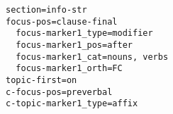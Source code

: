 \documentclass[a4paper]{article}
\begin{document}
{\small\begin{verbatim}
section=info-str
focus-pos=clause-final
  focus-marker1_type=modifier
  focus-marker1_pos=after
  focus-marker1_cat=nouns, verbs
  focus-marker1_orth=FC
topic-first=on
c-focus-pos=preverbal
c-topic-marker1_type=affix
\end{verbatim}}
\end{document}
